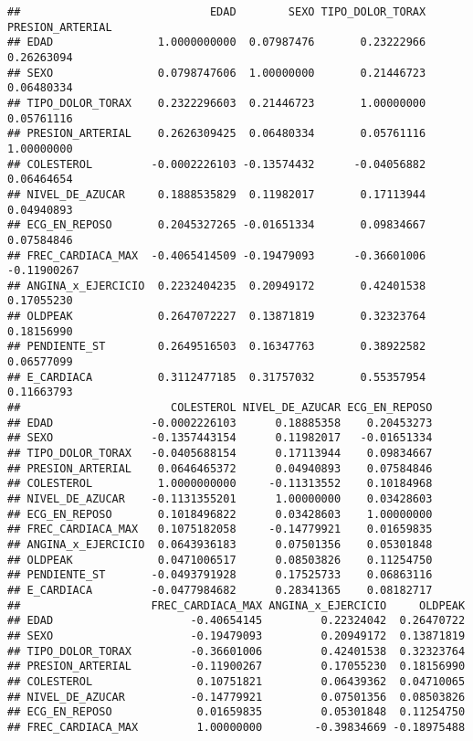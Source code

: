 \documentclass[
]{article}
\begin{document}
\begin{verbatim}
##                             EDAD        SEXO TIPO_DOLOR_TORAX PRESION_ARTERIAL
## EDAD                1.0000000000  0.07987476       0.23222966       0.26263094
## SEXO                0.0798747606  1.00000000       0.21446723       0.06480334
## TIPO_DOLOR_TORAX    0.2322296603  0.21446723       1.00000000       0.05761116
## PRESION_ARTERIAL    0.2626309425  0.06480334       0.05761116       1.00000000
## COLESTEROL         -0.0002226103 -0.13574432      -0.04056882       0.06464654
## NIVEL_DE_AZUCAR     0.1888535829  0.11982017       0.17113944       0.04940893
## ECG_EN_REPOSO       0.2045327265 -0.01651334       0.09834667       0.07584846
## FREC_CARDIACA_MAX  -0.4065414509 -0.19479093      -0.36601006      -0.11900267
## ANGINA_x_EJERCICIO  0.2232404235  0.20949172       0.42401538       0.17055230
## OLDPEAK             0.2647072227  0.13871819       0.32323764       0.18156990
## PENDIENTE_ST        0.2649516503  0.16347763       0.38922582       0.06577099
## E_CARDIACA          0.3112477185  0.31757032       0.55357954       0.11663793
##                       COLESTEROL NIVEL_DE_AZUCAR ECG_EN_REPOSO
## EDAD               -0.0002226103      0.18885358    0.20453273
## SEXO               -0.1357443154      0.11982017   -0.01651334
## TIPO_DOLOR_TORAX   -0.0405688154      0.17113944    0.09834667
## PRESION_ARTERIAL    0.0646465372      0.04940893    0.07584846
## COLESTEROL          1.0000000000     -0.11313552    0.10184968
## NIVEL_DE_AZUCAR    -0.1131355201      1.00000000    0.03428603
## ECG_EN_REPOSO       0.1018496822      0.03428603    1.00000000
## FREC_CARDIACA_MAX   0.1075182058     -0.14779921    0.01659835
## ANGINA_x_EJERCICIO  0.0643936183      0.07501356    0.05301848
## OLDPEAK             0.0471006517      0.08503826    0.11254750
## PENDIENTE_ST       -0.0493791928      0.17525733    0.06863116
## E_CARDIACA         -0.0477984682      0.28341365    0.08182717
##                    FREC_CARDIACA_MAX ANGINA_x_EJERCICIO     OLDPEAK
## EDAD                     -0.40654145         0.22324042  0.26470722
## SEXO                     -0.19479093         0.20949172  0.13871819
## TIPO_DOLOR_TORAX         -0.36601006         0.42401538  0.32323764
## PRESION_ARTERIAL         -0.11900267         0.17055230  0.18156990
## COLESTEROL                0.10751821         0.06439362  0.04710065
## NIVEL_DE_AZUCAR          -0.14779921         0.07501356  0.08503826
## ECG_EN_REPOSO             0.01659835         0.05301848  0.11254750
## FREC_CARDIACA_MAX         1.00000000        -0.39834669 -0.18975488

\end{verbatim}
\end{document}
